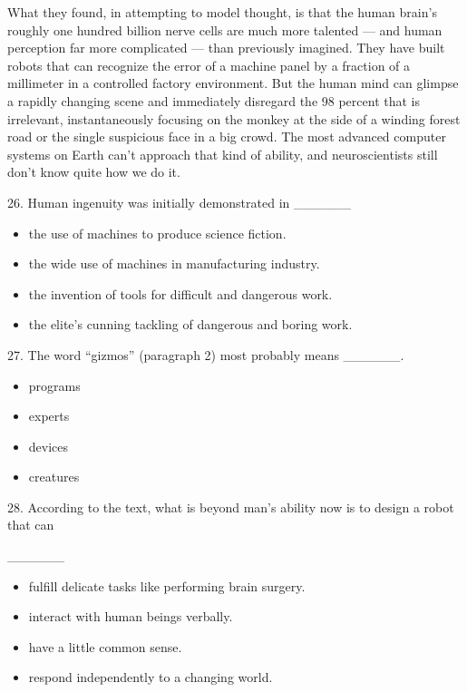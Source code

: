 \documentclass[UTF8,11pt]{ctexart}
\begin{document}
What they found, in attempting to model thought, is that the human brain’s roughly one hundred billion nerve cells are much more talented — and human perception far more complicated — than previously imagined. They have built robots that can recognize the error of a machine panel by a fraction of a millimeter in a controlled factory environment. But the human mind can glimpse a rapidly changing scene and immediately disregard the 98 percent that is irrelevant, instantaneously focusing on the monkey at the side of a winding forest road or the single suspicious face in a big crowd. The most advanced computer systems on Earth can’t approach that kind of ability, and neuroscientists still don’t know quite how we do it.


26. Human ingenuity was initially demonstrated in \_\_\_\_\_\_


\begin{itemize}[leftmargin=2em,itemsep=.2em,topsep=.4em]\item[A.] the use of machines to produce science fiction.
\item[B.] the wide use of machines in manufacturing industry.
\item[C.] the invention of tools for difficult and dangerous work.
\item[D.] the elite’s cunning tackling of dangerous and boring work.
\end{itemize}

27. The word “gizmos” (paragraph 2) most probably means \_\_\_\_\_\_.


\begin{itemize}[leftmargin=2em,itemsep=.2em,topsep=.4em]\item[A.] programs
\item[B.] experts
\item[C.] devices
\item[D.] creatures
\end{itemize}

28. According to the text, what is beyond man’s ability now is to design a robot that can


\_\_\_\_\_\_


\begin{itemize}[leftmargin=2em,itemsep=.2em,topsep=.4em]\item[A.] fulfill delicate tasks like performing brain surgery.
\item[B.] interact with human beings verbally.
\item[C.] have a little common sense.
\item[D.] respond independently to a changing world.
\end{itemize}
\end{document}
